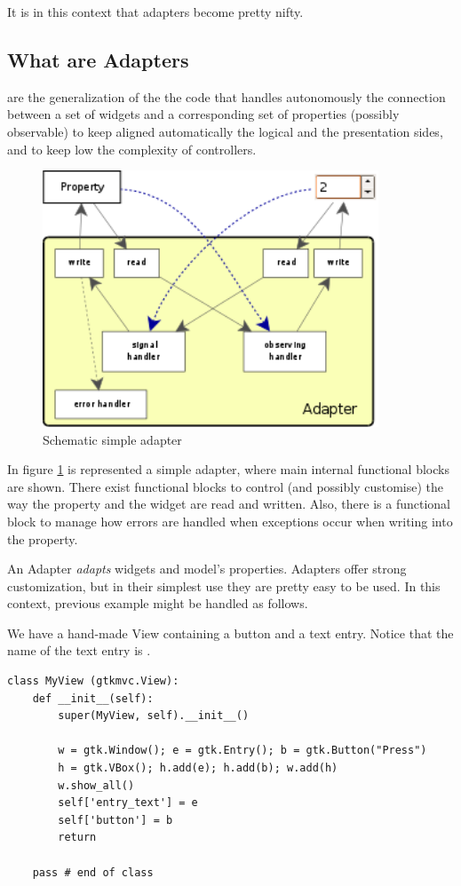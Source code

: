 \smallskip
It is in this context that adapters become pretty nifty. 

\subsection{What are Adapters}

 are the generalization of the the code that handles
autonomously the connection between a set of widgets and a
corresponding set of properties (possibly observable) to keep
aligned automatically the logical and the presentation sides, and to
keep low the complexity of controllers.

\begin{figure}[htbp]
\begin{center}
\includegraphics[width=10cm]{figs/png/adap}
\caption{\label{ADAP_f} Schematic simple adapter}
\end{center}
\end{figure}

In figure \ref{ADAP_f} is represented a simple adapter, where main
internal functional blocks are shown. There exist functional blocks
to control (and possibly customise) the way the property and the
widget are read and written. Also, there is a functional block to
manage how errors are handled when exceptions occur when writing
into the property.

An Adapter \emph{adapts} widgets and model's properties. Adapters
offer strong customization, but in their simplest use they are
pretty easy to be used. In this context, previous example might be
handled as follows.

We have a hand-made View containing a button and a text
entry. Notice that the name of the text entry is
.

{ \codesize
\begin{verbatim}
class MyView (gtkmvc.View):
    def __init__(self):
        super(MyView, self).__init__()

        w = gtk.Window(); e = gtk.Entry(); b = gtk.Button("Press")
        h = gtk.VBox(); h.add(e); h.add(b); w.add(h)
        w.show_all()
        self['entry_text'] = e
        self['button'] = b        
        return

    pass # end of class
\end{verbatim}
}


